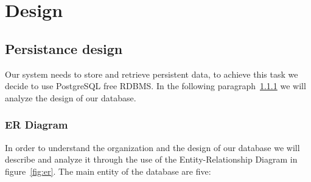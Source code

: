 \chapter{Design} \label{cap:cap3}

\section{Persistance design}
Our system needs to store and retrieve persistent data, to achieve this task we decide to use PostgreSQL free RDBMS. In the following paragraph~\ref{sec:er} we will analyze the design of our database.
\subsection{ER Diagram}\label{sec:er}
In order to understand the organization and the design of our database we will describe and analyze it through the use of the Entity-Relationship Diagram in figure~\ref{fig:er}.
The main entity of the database are five:
